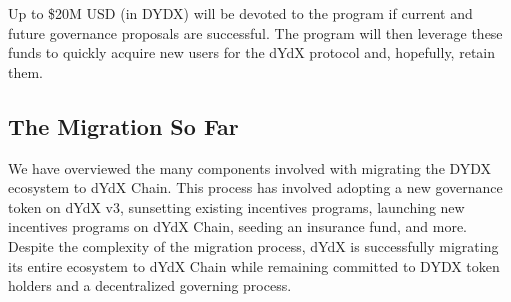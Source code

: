         Up to \$20M USD (in DYDX) will be devoted to the program if current and future governance proposals are successful. The program will then leverage these funds to quickly acquire new users for the dYdX protocol and, hopefully, retain them.
        
    \subsection{The Migration So Far}

        We have overviewed the many components involved with migrating the DYDX ecosystem to dYdX Chain. This process has involved adopting a new governance token on dYdX v3, sunsetting existing incentives programs, launching new incentives programs on dYdX Chain, seeding an insurance fund, and more. Despite the complexity of the migration process, dYdX is successfully migrating its entire ecosystem to dYdX Chain while remaining committed to DYDX token holders and a decentralized governing process.